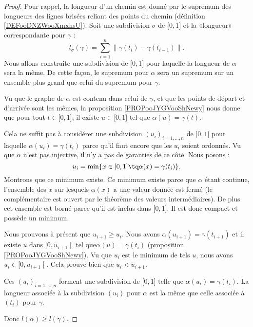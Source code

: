 \begin{proof}
	Pour rappel, la longueur d'un chemin est donné par le supremum des longueurs des lignes brisées reliant des points du chemin (définition \ref{DEFooDNZWooXmxhsU}). Soit une subdivision \( \sigma\) de \( \mathopen[ 0 , 1 \mathclose]\) et la «longueur» correspondante pour \( \gamma\) :
	\begin{equation}
		l_{\sigma}(\gamma)=\sum_{i=1}^n\| \gamma(t_i)-\gamma(t_{i-1}) \|.
	\end{equation}
	Nous allons construite une subdivision de \( \mathopen[ 0 , 1 \mathclose]\) pour laquelle la longueur de \( \alpha\) sera la même. De cette façon, le supremum pour \( \alpha\) sera un supremum sur un ensemble plus grand que celui du supremum pour \( \gamma\).

	Vu que le graphe de \( \alpha\) est contenu dans celui de \( \gamma\), et que les points de départ et d'arrivée sont les mêmes, la proposition \ref{PROPooJYGVooShNewy} nous donne que pour tout \( t\in \mathopen[ 0 , 1 \mathclose]\), il existe \( u\in\mathopen[ 0 , 1 \mathclose]\) tel que \( \alpha(u)=\gamma(t)\).

	Cela ne suffit pas à considérer une subdivision \( (u_i)_{i=1,\ldots, n}\) de \( \mathopen[ 0 , 1 \mathclose]\) pour laquelle \( \alpha(u_i)=\gamma(t_i)\) parce qu'il faut encore que les \( u_i\) soient ordonnés. Vu que \( \alpha\) n'est pas injective, il n'y a pas de garanties de ce côté. Nous posons :
	\begin{equation}
		u_i=\min\{ x\in \mathopen[ 0 , 1 \mathclose]\tq \alpha(x)=\gamma(t_i) \}.
	\end{equation}
	Montrons que ce minimum existe. Ce minimum existe parce que \( \alpha\) étant continue, l'ensemble des \( x\) sur lesquels \( \alpha(x)\) a une valeur donnée est fermé (le complémentaire est ouvert par le théorème des valeurs intermédiaires). De plus cet ensemble est borné parce qu'il est inclus dans \( \mathopen[ 0 , 1 \mathclose]\). Il est donc compact et possède un minimum.

	Nous prouvons à présent que \( u_{i+1}\geq u_i\). Nous avons \( \alpha(u_{i+1})=\gamma(t_{i+1})\) et il existe \( u\) dans \( \mathopen[ 0 , u_{i+1} \mathclose[\) tel que\( \alpha(u)=\gamma(t_i)\) (proposition \ref{PROPooJYGVooShNewy}). Vu que \( u_i\) est le minimum de tels \( u\), nous avons \( u_i\in\mathopen[ 0 , u_{i+1} \mathclose[\). Cela prouve bien que \( u_i<u_{i+1}\).

	Ces \( (u_i)_{i=1,\ldots, n}\) forment une subdivision de \( \mathopen[ 0 , 1 \mathclose]\) telle que \( \alpha(u_i)=\gamma(t_i)\). La longueur associée à la subdivision \( (u_i)\) pour \( \alpha\) est la même que celle associée à \( (t_i)\) pour \( \gamma\).

	Donc \( l(\alpha)\geq l(\gamma)\).
\end{proof}


